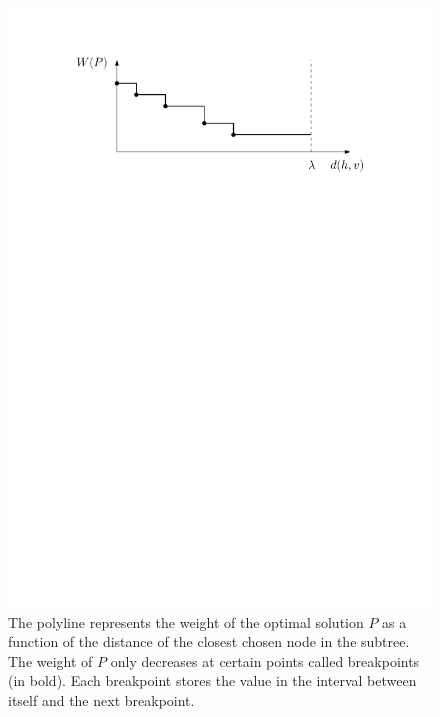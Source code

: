 \documentclass[a4paper,UKenglish]{lipics-v2016}
\theoremstyle{plain}
\begin{document}
\begin{figure}[ht]
\begin{center}
\includegraphics[scale=0.55]{polyline}
\end{center}
\caption{The polyline represents the weight of the optimal solution $P$ as a function of the distance of the closest chosen node in the subtree. %
The weight of $P$ only decreases at certain points called breakpoints (in bold). Each breakpoint stores the value in the interval between itself and the next breakpoint.
\label{figure of a polyline}}
\end{figure}
\end{document}
